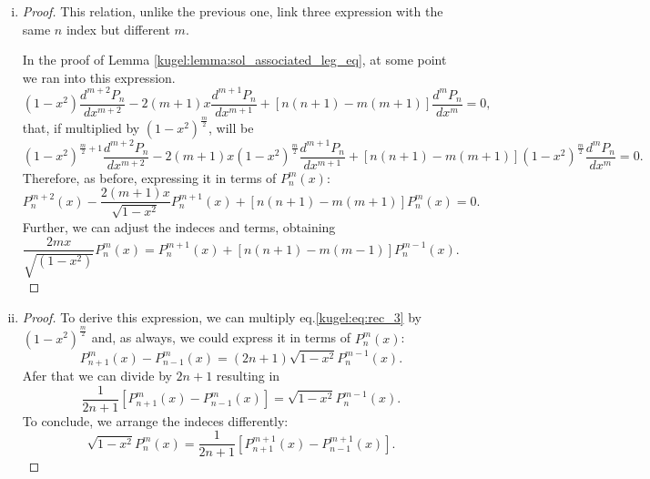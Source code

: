 \begin{enumerate}[(i)]
  \item
  \begin{proof}
    This relation, unlike the previous one, link three expression with the same $n$ index but different $m$. 
    
    In the proof of Lemma \ref{kugel:lemma:sol_associated_leg_eq}, at some point we ran into this expression.
    \begin{equation*}
      (1-x^2)\frac{d^{m+2}P_n}{dx^{m+2}} - 2(m+1)x \frac{d^{m+1}P_n}{dx^{m+1}} + [n(n+1)-m(m+1)]\frac{d^mP_n}{dx^m} = 0,
    \end{equation*}
    that, if multiplied by $(1-x^2)^{\frac{m}{2}}$, will be
    \begin{equation*}
      (1-x^2)^{\frac{m}{2}+1}\frac{d^{m+2}P_n}{dx^{m+2}} - 2(m+1)x (1-x^2)^{\frac{m}{2}}\frac{d^{m+1}P_n}{dx^{m+1}} + [n(n+1)-m(m+1)](1-x^2)^{\frac{m}{2}}\frac{d^mP_n}{dx^m} = 0.
    \end{equation*}
    Therefore, as before, expressing it in terms of $P^m_n(x)$:
    \begin{equation*}
      P^{m+2}_n(x) - \frac{2(m+1)x}{\sqrt{1-x^2}}P^{m+1}_n(x) + [n(n+1)-m(m+1)]P^m_n(x)=0.
    \end{equation*}
    Further, we can adjust the indeces and terms, obtaining
    \begin{equation*}
      \frac{2mx}{\sqrt{(1-x^2)}} P^m_n(x) = P^{m+1}_n(x) + [n(n+1)-m(m-1)] P^{m-1}_n(x).
    \end{equation*}
  
  \end{proof}
  
  \item
  \begin{proof}
    To derive this expression, we can multiply eq.\eqref{kugel:eq:rec_3} by $(1-x^2)^{\frac{m}{2}}$ and, as always, we could express it in terms of $P^m_n(x)$:
    \begin{equation*}
      P^m_{n+1}(x) - P^m_{n-1}(x) = (2n+1)\sqrt{1-x^2}P^{m-1}_n(x).
    \end{equation*}
    Afer that we can divide by $2n+1$ resulting in
    \begin{equation}\label{kugel:eq:helper}
      \frac{1}{2n+1}[P^m_{n+1}(x) - P^m_{n-1}(x)] = \sqrt{1-x^2}P^{m-1}_n(x).
    \end{equation}
    To conclude, we arrange the indeces differently:
    \begin{equation*}
      \sqrt{1-x^2}P^{m}_n(x)=\frac{1}{2n+1}[P^{m+1}_{n+1}(x) - P^{m+1}_{n-1}(x)].
    \end{equation*}
  \end{proof}


\end{enumerate}
